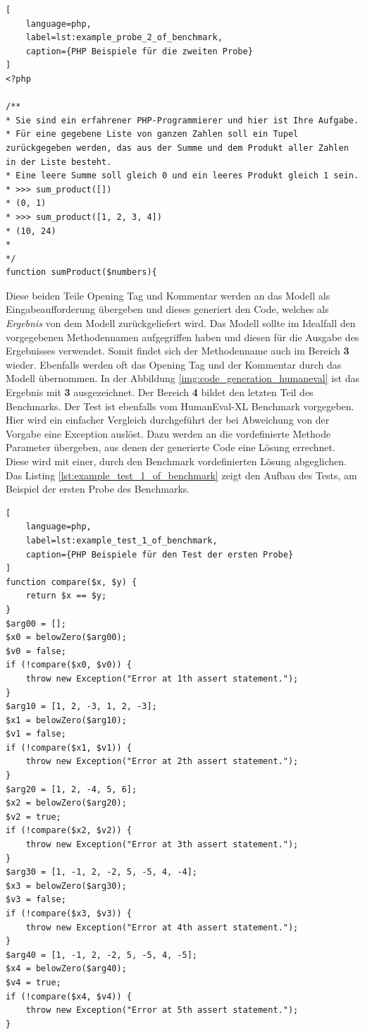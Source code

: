\begin{lstlisting}[
	language=php,
	label=lst:example_probe_2_of_benchmark,
	caption={PHP Beispiele für die zweiten Probe}
]
<?php

/**
* Sie sind ein erfahrener PHP-Programmierer und hier ist Ihre Aufgabe.
* Für eine gegebene Liste von ganzen Zahlen soll ein Tupel zurückgegeben werden, das aus der Summe und dem Produkt aller Zahlen in der Liste besteht.
* Eine leere Summe soll gleich 0 und ein leeres Produkt gleich 1 sein.
* >>> sum_product([])
* (0, 1)
* >>> sum_product([1, 2, 3, 4])
* (10, 24)
*
*/
function sumProduct($numbers){
\end{lstlisting}
	
Diese beiden Teile Opening Tag und Kommentar werden an das Modell als Eingabeaufforderung übergeben und dieses generiert den Code, welches als \textit{Ergebnis} von dem Modell zurückgeliefert wird. Das Modell sollte im Idealfall den vorgegebenen Methodennamen aufgegriffen haben und diesen für die Ausgabe des Ergebnisses verwendet. Somit findet sich der Methodenname auch im Bereich \textbf{3} wieder. Ebenfalls werden oft das Opening Tag und der Kommentar durch das Modell übernommen. In der Abbildung \ref{img:code_generation_humaneval} ist das Ergebnis mit \textbf{3} ausgezeichnet. Der Bereich \textbf{4} bildet den letzten Teil des Benchmarks. Der Test ist ebenfalls vom HumanEval-XL Benchmark vorgegeben. Hier wird ein einfacher Vergleich durchgeführt der bei Abweichung von der Vorgabe eine Exception auslöst. Dazu werden an die vordefinierte Methode Parameter übergeben, aus denen der generierte Code eine Lösung errechnet. Diese wird mit einer, durch den Benchmark vordefinierten Lösung abgeglichen. Das Listing \ref{lst:example_test_1_of_benchmark} zeigt den Aufbau des Tests, am Beispiel der ersten Probe des Benchmarks.\vspace{0.2cm}

\begin{lstlisting}[
	language=php,
	label=lst:example_test_1_of_benchmark,
	caption={PHP Beispiele für den Test der ersten Probe}
]
function compare($x, $y) {
	return $x == $y;
}
$arg00 = [];
$x0 = belowZero($arg00);
$v0 = false;
if (!compare($x0, $v0)) {
	throw new Exception("Error at 1th assert statement.");
}
$arg10 = [1, 2, -3, 1, 2, -3];
$x1 = belowZero($arg10);
$v1 = false;
if (!compare($x1, $v1)) {
	throw new Exception("Error at 2th assert statement.");
}
$arg20 = [1, 2, -4, 5, 6];
$x2 = belowZero($arg20);
$v2 = true;
if (!compare($x2, $v2)) {
	throw new Exception("Error at 3th assert statement.");
}
$arg30 = [1, -1, 2, -2, 5, -5, 4, -4];
$x3 = belowZero($arg30);
$v3 = false;
if (!compare($x3, $v3)) {
	throw new Exception("Error at 4th assert statement.");
}
$arg40 = [1, -1, 2, -2, 5, -5, 4, -5];
$x4 = belowZero($arg40);
$v4 = true;
if (!compare($x4, $v4)) {
	throw new Exception("Error at 5th assert statement.");
}
\end{lstlisting}

